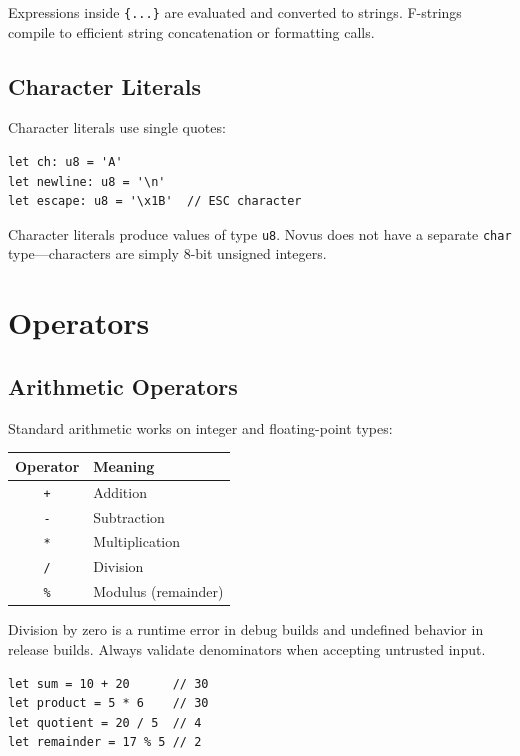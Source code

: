 Expressions inside \texttt{\{...\}} are evaluated and converted to strings. F-strings compile to efficient string concatenation or formatting calls.

\subsection{Character Literals}

Character literals use single quotes:

\begin{lstlisting}
let ch: u8 = 'A'
let newline: u8 = '\n'
let escape: u8 = '\x1B'  // ESC character
\end{lstlisting}

Character literals produce values of type \texttt{u8}. Novus does not have a separate \texttt{char} type---characters are simply 8-bit unsigned integers.

\section{Operators}

\subsection{Arithmetic Operators}

Standard arithmetic works on integer and floating-point types:

\begin{center}
\begin{tabular}{cl}
\textbf{Operator} & \textbf{Meaning} \\
\hline
\texttt{+} & Addition \\
\texttt{-} & Subtraction \\
\texttt{*} & Multiplication \\
\texttt{/} & Division \\
\texttt{\%} & Modulus (remainder) \\
\end{tabular}
\end{center}

Division by zero is a runtime error in debug builds and undefined behavior in release builds. Always validate denominators when accepting untrusted input.

\begin{lstlisting}
let sum = 10 + 20      // 30
let product = 5 * 6    // 30
let quotient = 20 / 5  // 4
let remainder = 17 % 5 // 2
\end{lstlisting}

